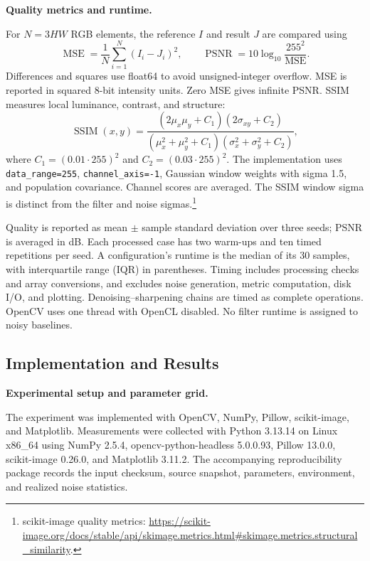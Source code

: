 \documentclass[a4paper,12pt]{article}
\begin{document}
\textbf{Quality metrics and runtime.}\par
For $N=3HW$ RGB elements, the reference $I$ and result $J$ are compared using
\begin{equation}
\operatorname{MSE}=\frac{1}{N}\sum_{i=1}^{N}(I_i-J_i)^2,
\qquad
\operatorname{PSNR}=10\log_{10}\frac{255^2}{\operatorname{MSE}}.
\end{equation}
Differences and squares use float64 to avoid unsigned-integer overflow. MSE is reported in squared 8-bit intensity units. Zero MSE gives infinite PSNR. SSIM measures local luminance, contrast, and structure:
\begin{equation}
\operatorname{SSIM}(x,y)=
\frac{(2\mu_x\mu_y+C_1)(2\sigma_{xy}+C_2)}
{(\mu_x^2+\mu_y^2+C_1)(\sigma_x^2+\sigma_y^2+C_2)},
\end{equation}
where $C_1=(0.01\cdot255)^2$ and $C_2=(0.03\cdot255)^2$. The implementation uses \texttt{data\_range=255}, \texttt{channel\_axis=-1}, Gaussian window weights with sigma 1.5, and population covariance. Channel scores are averaged. The SSIM window sigma is distinct from the filter and noise sigmas.\footnote{scikit-image quality metrics: \url{https://scikit-image.org/docs/stable/api/skimage.metrics.html\#skimage.metrics.structural_similarity}.}

Quality is reported as mean $\pm$ sample standard deviation over three seeds; PSNR is averaged in dB. Each processed case has two warm-ups and ten timed repetitions per seed. A configuration's runtime is the median of its 30 samples, with interquartile range (IQR) in parentheses. Timing includes processing checks and array conversions, and excludes noise generation, metric computation, disk I/O, and plotting. Denoising--sharpening chains are timed as complete operations. OpenCV uses one thread with OpenCL disabled. No filter runtime is assigned to noisy baselines.

\subsection{Implementation and Results}

\textbf{Experimental setup and parameter grid.}\par
The experiment was implemented with OpenCV, NumPy, Pillow, scikit-image, and Matplotlib. Measurements were collected with Python 3.13.14 on Linux x86\_64 using NumPy 2.5.4, opencv-python-headless 5.0.0.93, Pillow 13.0.0, scikit-image 0.26.0, and Matplotlib 3.11.2. The accompanying reproducibility package records the input checksum, source snapshot, parameters, environment, and realized noise statistics.
\end{document}
